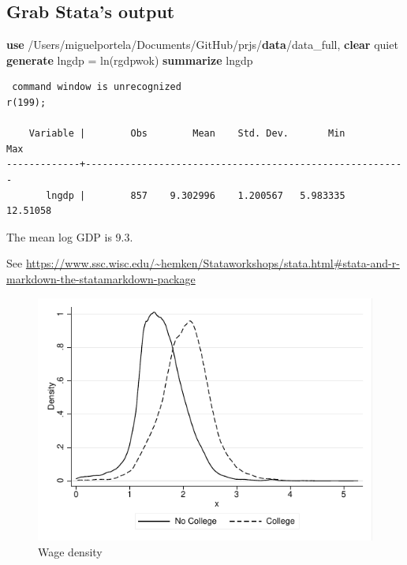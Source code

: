 \documentclass[
  12pt,
]{article}
\newenvironment{Shaded}{\begin{snugshade}}{\end{snugshade}}
\newcommand{\FunctionTok}[1]{\textcolor[rgb]{0.00,0.00,0.00}{#1}}
\newcommand{\KeywordTok}[1]{\textcolor[rgb]{0.13,0.29,0.53}{\textbf{#1}}}
\newcommand{\NormalTok}[1]{#1}
\begin{document}
\hypertarget{grab-statas-output}{%
\subsection{Grab Stata's output}\label{grab-statas-output}}

\begin{Shaded}
\begin{Highlighting}[]
\KeywordTok{use}\NormalTok{ /Users/miguelportela/Documents/GitHub/prjs/}\KeywordTok{data}\NormalTok{/data_full, }\KeywordTok{clear}
\NormalTok{        quiet }\KeywordTok{generate}\NormalTok{ lngdp = }\FunctionTok{ln}\NormalTok{(rgdpwok)}
      \KeywordTok{summarize}\NormalTok{ lngdp}
\end{Highlighting}
\end{Shaded}

\begin{verbatim}
 command window is unrecognized
r(199);

    Variable |        Obs        Mean    Std. Dev.       Min        Max
-------------+---------------------------------------------------------
       lngdp |        857    9.302996    1.200567   5.983335   12.51058
\end{verbatim}

\vspace{0.3cm}

The mean log GDP is 9.3.

\vspace{0.3cm}

See \url{https://www.ssc.wisc.edu/~hemken/Stataworkshops/stata.html\#stata-and-r-markdown-the-statamarkdown-package}

\begin{figure}
\centering
\includegraphics{logs/density.pdf}
\caption{Wage density}
\end{figure}
\end{document}
